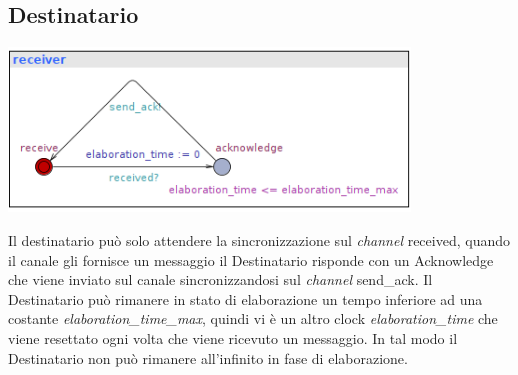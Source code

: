 \documentclass[a4paper]{article}
\newcommand{\channel}{\textit{channel }}
\begin{document}
\subsection{Destinatario}
\begin{center}\includegraphics[width=0.8\textwidth]{1_receiver.png}\end{center}
Il destinatario può solo attendere la sincronizzazione sul \channel received, quando il canale gli fornisce un messaggio il Destinatario risponde con un Acknowledge che viene inviato sul canale sincronizzandosi sul \channel send\_ack.
Il Destinatario può rimanere in stato di elaborazione un tempo inferiore ad una costante \textit{elaboration\_time\_max}, quindi vi è un altro clock \textit{elaboration\_time} che viene resettato ogni volta che viene ricevuto un messaggio.
In tal modo il Destinatario non può rimanere all'infinito in fase di elaborazione.
\end{document}
